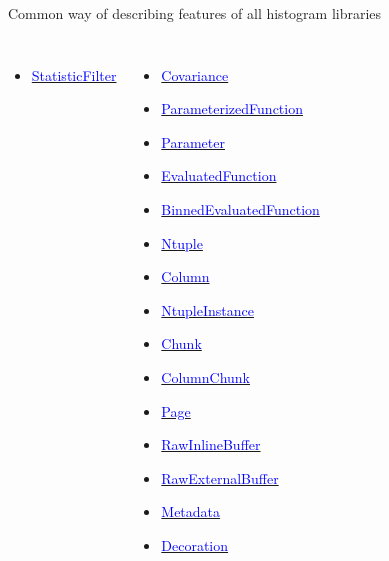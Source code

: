 \documentclass[aspectratio=169]{beamer}
\begin{document}
\begin{frame}{Common way of describing features of all histogram libraries}
\begin{columns}[t]
\begin{itemize}
  \item \href{https://github.com/scikit-hep/aghast/blob/master/specification.adoc\#statisticfilter}{\textcolor{blue}{StatisticFilter}}
\end{itemize}
\begin{itemize}
  \item \href{https://github.com/scikit-hep/aghast/blob/master/specification.adoc\#covariance}{\textcolor{blue}{Covariance}}
  \item \href{https://github.com/scikit-hep/aghast/blob/master/specification.adoc\#parameterizedfunction}{\textcolor{blue}{ParameterizedFunction}}
  \item \href{https://github.com/scikit-hep/aghast/blob/master/specification.adoc\#parameter}{\textcolor{blue}{Parameter}}
  \item \href{https://github.com/scikit-hep/aghast/blob/master/specification.adoc\#evaluatedfunction}{\textcolor{blue}{EvaluatedFunction}}
  \item \href{https://github.com/scikit-hep/aghast/blob/master/specification.adoc\#binnedevaluatedfunction}{\textcolor{blue}{BinnedEvaluatedFunction}}
  \item \href{https://github.com/scikit-hep/aghast/blob/master/specification.adoc\#ntuple}{\textcolor{blue}{Ntuple}}
  \item \href{https://github.com/scikit-hep/aghast/blob/master/specification.adoc\#column}{\textcolor{blue}{Column}}
  \item \href{https://github.com/scikit-hep/aghast/blob/master/specification.adoc\#ntupleinstance}{\textcolor{blue}{NtupleInstance}}
  \item \href{https://github.com/scikit-hep/aghast/blob/master/specification.adoc\#chunk}{\textcolor{blue}{Chunk}}
  \item \href{https://github.com/scikit-hep/aghast/blob/master/specification.adoc\#columnchunk}{\textcolor{blue}{ColumnChunk}}
  \item \href{https://github.com/scikit-hep/aghast/blob/master/specification.adoc\#page}{\textcolor{blue}{Page}}
  \item \href{https://github.com/scikit-hep/aghast/blob/master/specification.adoc\#rawinlinebuffer}{\textcolor{blue}{RawInlineBuffer}}
  \item \href{https://github.com/scikit-hep/aghast/blob/master/specification.adoc\#rawexternalbuffer}{\textcolor{blue}{RawExternalBuffer}}
  \item \href{https://github.com/scikit-hep/aghast/blob/master/specification.adoc\#metadata}{\textcolor{blue}{Metadata}}
  \item \href{https://github.com/scikit-hep/aghast/blob/master/specification.adoc\#decoration}{\textcolor{blue}{Decoration}}
\end{itemize}
\end{columns}
\end{frame}
\end{document}

